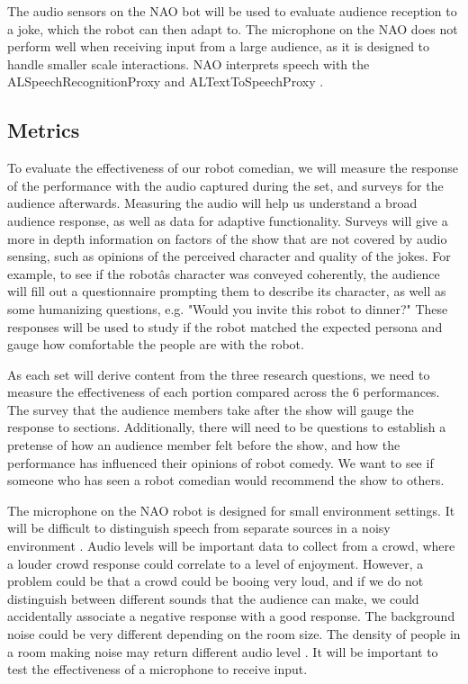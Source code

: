 \documentclass[onecolumn, draftclsnofoot,10pt, compsoc]{IEEEtran}
\begin{document}
The audio sensors on the NAO bot will be used to evaluate audience reception to a joke, which the robot can then adapt to. The microphone on the NAO does not perform well when receiving input from a large audience, as it is designed to handle smaller scale interactions. NAO interprets speech with the ALSpeechRecognitionProxy and ALTextToSpeechProxy \cite{audiodocs}.


\subsection{Metrics}

To evaluate the effectiveness of our robot comedian, we will measure the response of the performance with the audio captured during the set, and surveys for the audience afterwards. Measuring the audio will help us understand a broad audience response, as well as data for adaptive functionality. Surveys will give a more in depth information on factors of the show that are not covered by audio sensing, such as opinions of the perceived character and quality of the jokes. For example, to see if the robotâs character was conveyed coherently, the audience will fill out a questionnaire prompting them to describe its character, as well as some humanizing questions, e.g. "Would you invite this robot to dinner?" These responses will be used to study if the robot matched the expected persona and gauge how comfortable the people are with the robot.


As each set will derive content from the three research questions, we need to measure the effectiveness of each portion compared across the 6 performances. The survey that the audience members take after the show will gauge the response to sections. Additionally, there will need to be questions to establish a pretense of how an audience member felt before the show, and how the performance has influenced their opinions of robot comedy. We want to see if someone who has seen a robot comedian would recommend the show to others.

The microphone on the NAO robot is designed for small environment settings. It will be difficult to distinguish speech from separate sources in a noisy environment \cite{alsounddetection}. Audio levels will be important data to collect from a crowd, where a louder crowd response could correlate to a level of enjoyment. However, a problem could be that a crowd could be booing very loud, and if we do not distinguish between different sounds that the audience can make, we could accidentally associate a negative response with a good response. The background noise could be very different depending on the room size. The density of people in a room making noise may return different audio level \cite{alsoundlocalization}. It will be important to test the effectiveness of a microphone to receive input.
\end{document}
